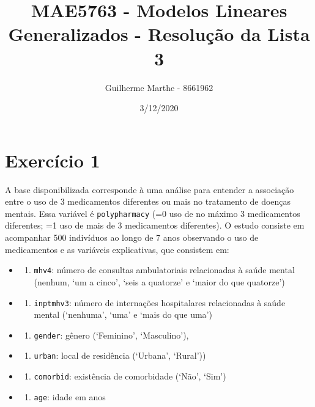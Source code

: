 \documentclass[
  11pt,
]{article}
\title{MAE5763 - Modelos Lineares Generalizados - Resolução da Lista 3}
\author{Guilherme Marthe - 8661962}
\date{3/12/2020}
\providecommand{\tightlist}{%
  \setlength{\itemsep}{0pt}\setlength{\parskip}{0pt}}
\begin{document}
\maketitle

\captionsetup[table]{labelformat=empty}

\hypertarget{exercuxedcio-1}{%
\section{Exercício 1}\label{exercuxedcio-1}}

A base disponibilizada corresponde à uma análise para entender a associação entre o uso de 3 medicamentos diferentes ou mais no tratamento de doenças mentais. Essa variável é \texttt{polypharmacy} (=0 uso de no máximo 3 medicamentos diferentes; =1 uso de mais de 3 medicamentos diferentes). O estudo consiste em acompanhar 500 indivíduos ao longo de 7 anos observando o uso de medicamentos e as variáveis explicativas, que consistem em:

\begin{itemize}
\item
  \begin{enumerate}
  \def\labelenumi{(\roman{enumi})}
  \tightlist
  \item
    \texttt{mhv4}: número de consultas ambulatoriais relacionadas à saúde mental (nenhum, `um a cinco', `seis a quatorze' e `maior do que quatorze')
  \end{enumerate}
\item
  \begin{enumerate}
  \def\labelenumi{(\roman{enumi})}
  \setcounter{enumi}{1}
  \tightlist
  \item
    \texttt{inptmhv3}: número de internações hospitalares relacionadas à saúde mental (`nenhuma', `uma' e `mais do que uma')
  \end{enumerate}
\item
  \begin{enumerate}
  \def\labelenumi{(\roman{enumi})}
  \setcounter{enumi}{2}
  \tightlist
  \item
    \texttt{gender}: gênero (`Feminino', `Masculino'),
  \end{enumerate}
\item
  \begin{enumerate}
  \def\labelenumi{(\roman{enumi})}
  \setcounter{enumi}{3}
  \tightlist
  \item
    \texttt{urban}: local de residência (`Urbana', `Rural'))
  \end{enumerate}
\item
  \begin{enumerate}
  \def\labelenumi{(\alph{enumi})}
  \setcounter{enumi}{21}
  \tightlist
  \item
    \texttt{comorbid}: existência de comorbidade (`Não', `Sim')
  \end{enumerate}
\item
  \begin{enumerate}
  \def\labelenumi{(\roman{enumi})}
  \setcounter{enumi}{5}
  \tightlist
  \item
    \texttt{age}: idade em anos
  \end{enumerate}
\end{itemize}
\end{document}
